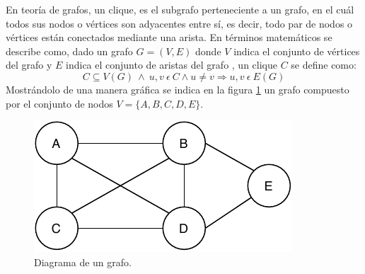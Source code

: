 En teoría de grafos, un clique, es el subgrafo perteneciente a un grafo, en el cuál todos sus nodos o vértices son adyacentes entre sí, es decir, todo par de nodos o vértices están conectados mediante una arista. En términos matemáticos se describe como, dado un grafo $G = (V, E)$ donde $V$ indica el conjunto de vértices del grafo y $E$ indica el conjunto de aristas del grafo \cite{web-clique}, un clique $C$ se define como:
\[
C \subseteq V(G) ~ \wedge ~ u, v ~ \epsilon ~ C  \wedge  u  \neq v \Rightarrow u, v ~ \epsilon ~ E(G)
\]
Mostrándolo de una manera gráfica se indica en la figura  \ref{fig:graph} un grafo compuesto por el conjunto de nodos $V=\{A, B, C, D, E\}$.

\begin{figure}[H]
	\centering
	\includegraphics{Figures/graph.pdf}
	\caption{Diagrama de un grafo.}
	\label{fig:graph}
\end{figure}

